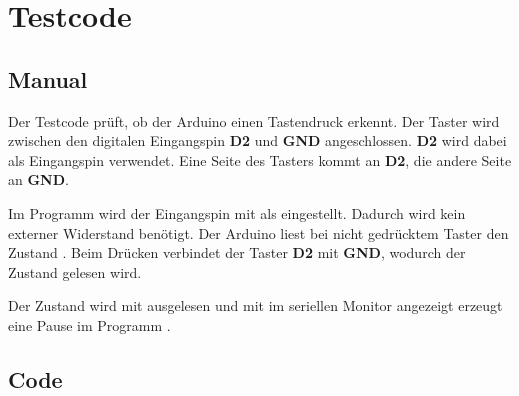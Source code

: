 \section{Testcode}

\subsection{Manual}
Der Testcode prüft, ob der Arduino einen Tastendruck erkennt. Der Taster wird zwischen den digitalen Eingangspin \textbf{D2} und \textbf{GND} angeschlossen. \textbf{D2} wird dabei als Eingangspin verwendet. Eine Seite des Tasters kommt an \textbf{D2}, die andere Seite an \textbf{GND}.

Im Programm wird der Eingangspin mit  als  eingestellt. Dadurch wird kein externer Widerstand benötigt. Der Arduino liest bei nicht gedrücktem Taster den Zustand . Beim Drücken verbindet der Taster \textbf{D2} mit \textbf{GND}, wodurch der Zustand  gelesen wird.

Der Zustand wird mit  ausgelesen und mit  im seriellen Monitor angezeigt  erzeugt eine Pause im Programm \cite{arduino_pinmode}\cite{arduino_digitalread}\cite{arduino:language-reference}.

\subsection{Code}

{
	\label{lst:TestButton}
}